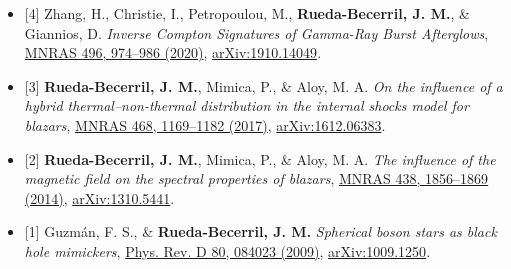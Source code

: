 \documentclass[10pt,letterpaper]{article}
\newcommand{\cvsubsection}[1]{%
  \vspace{3pt}{\bfseries #1}\par\nopagebreak\vspace{2pt}\nopagebreak}
\begin{document}
\begin{itemize}[label={}, leftmargin=1.5em, itemindent=-1.5em, labelwidth=0pt, labelsep=0pt]
  \item{} [4] Zhang, H., Christie, I., Petropoulou, M., \textbf{Rueda-Becerril, J. M.}, \& Giannios, D. \textit{Inverse Compton Signatures of Gamma-Ray Burst Afterglows}, \href{https://doi.org/10.1093/mnras/staa1583}{MNRAS 496, 974–986 (2020)}, \href{https://arxiv.org/abs/1910.14049}{arXiv:1910.14049}.
  \item{} [3] \textbf{Rueda-Becerril, J. M.}, Mimica, P., \& Aloy, M. A. \textit{On the influence of a hybrid thermal–non-thermal distribution in the internal shocks model for blazars}, \href{https://doi.org/10.1093/mnras/stx476}{MNRAS 468, 1169–1182 (2017)}, \href{https://arxiv.org/abs/1612.06383}{arXiv:1612.06383}.
  \item{} [2] \textbf{Rueda-Becerril, J. M.}, Mimica, P., \& Aloy, M. A. \textit{The influence of the magnetic field on the spectral properties of blazars}, \href{https://doi.org/10.1093/mnras/stt2335}{MNRAS 438, 1856–1869 (2014)}, \href{https://arxiv.org/abs/1310.5441}{arXiv:1310.5441}.
  \item{} [1] Guzmán, F. S., \& \textbf{Rueda-Becerril, J. M.} \textit{Spherical boson stars as black hole mimickers}, \href{https://doi.org/10.1103/PhysRevD.80.084023}{Phys. Rev. D 80, 084023 (2009)}, \href{https://arxiv.org/abs/1009.1250}{arXiv:1009.1250}.
\end{itemize}
\cvsubsection{Conference Proceedings}
\end{document}
